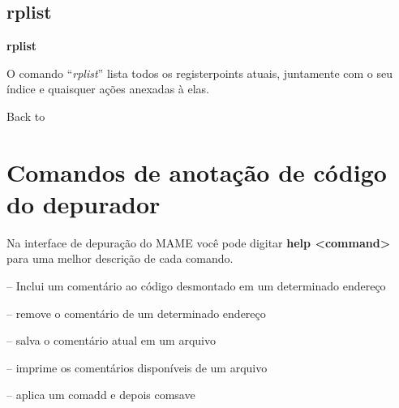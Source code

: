 \documentclass[letterpaper,10pt,brazil]{sphinxmanual}
\begin{document}
\subsection{rplist}
\label{debugger/registerpoints:debugger-command-rplist}\label{debugger/registerpoints:rplist}
\begin{DUlineblock}{0em}
\item[]
\begin{DUlineblock}{\DUlineblockindent}
\item[] \textbf{rplist}
\item[] 
\end{DUlineblock}
\item[] O comando ``\emph{rplist}'' lista todos os registerpoints atuais, juntamente com o seu índice e quaisquer ações anexadas à elas.
\item[] 
\item[] Back to {\hyperref[debugger/registerpoints:debugger\string-registerpoints\string-list]{}}
\end{DUlineblock}


\section{Comandos de anotação de código do depurador}
\label{debugger/annotation::doc}\label{debugger/annotation:debugger-annotation-list}\label{debugger/annotation:comandos-de-anotacao-de-codigo-do-depurador}
Na interface de depuração do MAME você pode digitar \textbf{help \textless{}command\textgreater{}}
para uma melhor descrição de cada comando.

\begin{DUlineblock}{0em}
\item[] {\hyperref[debugger/annotation:debugger\string-command\string-comadd]{}} -- Inclui um comentário ao código desmontado em um determinado endereço
\item[] {\hyperref[debugger/annotation:debugger\string-command\string-comdelete]{}} -- remove o comentário de um determinado endereço
\item[] {\hyperref[debugger/annotation:debugger\string-command\string-comsave]{}} -- salva o comentário atual em um arquivo
\item[] {\hyperref[debugger/annotation:debugger\string-command\string-comlist]{}} -- imprime os comentários disponíveis de um arquivo
\item[] {\hyperref[debugger/annotation:debugger\string-command\string-commit]{}} -- aplica um comadd e depois comsave
\end{DUlineblock}
\begin{quote}
\label{debugger/annotation:debugger-command-comadd}\end{quote}
\end{document}
